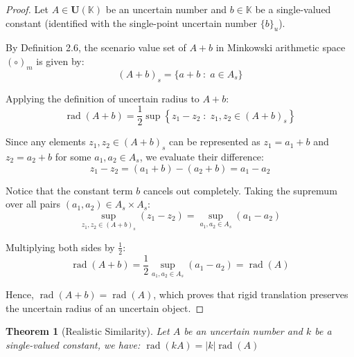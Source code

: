 \documentclass[a4paper,12pt, twoside]{memoir}
\newtheorem{theorem}{Theorem}[chapter]
\DeclareMathOperator{\rad}{rad}
\newcommand{\set}[1]{\left\{#1\right\}} %
\newcommand{\tsbd}[1]{\mathbf{U}(\mathbb{#1})}
\begin{document}
\begin{proof}
	Let $A \in \tsbd{K}$ be an uncertain number and $b \in \mathbb{K}$ be a single-valued constant (identified with the single-point uncertain number $\{b\}_u$).

	By Definition 2.6, the scenario value set of $A + b$ in Minkowski arithmetic space $(\circ)_m$ is given by:
	\[
		(A + b)_s = \{a + b \;:\; a \in A_s\}
	\]

	Applying the definition of uncertain radius to $A + b$:
	\[
		\rad(A + b) = \frac{1}{2} \sup \set{z_1 - z_2 \;:\; z_1, z_2 \in (A + b)_s}
	\]

	Since any elements $z_1, z_2 \in (A + b)_s$ can be represented as $z_1 = a_1 + b$ and $z_2 = a_2 + b$ for some $a_1, a_2 \in A_s$, we evaluate their difference:
	\[
		z_1 - z_2 = (a_1 + b) - (a_2 + b) = a_1 - a_2
	\]

	Notice that the constant term $b$ cancels out completely. Taking the supremum over all pairs $(a_1, a_2) \in A_s \times A_s$:
	\[
		\sup_{z_1, z_2 \in (A + b)_s} (z_1 - z_2) = \sup_{a_1, a_2 \in A_s} (a_1 - a_2)
	\]

	Multiplying both sides by $\frac{1}{2}$:
	\[
		\rad(A + b) = \frac{1}{2} \sup_{a_1, a_2 \in A_s} (a_1 - a_2) = \rad(A)
	\]

	Hence, $\rad(A + b) = \rad(A)$, which proves that rigid translation preserves the uncertain radius of an uncertain object.
\end{proof}
\begin{theorem}[Realistic Similarity]
	Let $A$ be an uncertain number and $k$ be a single-valued constant, we have: $\rad(k A) = |k| \rad(A)$
\end{theorem}
\end{document}
